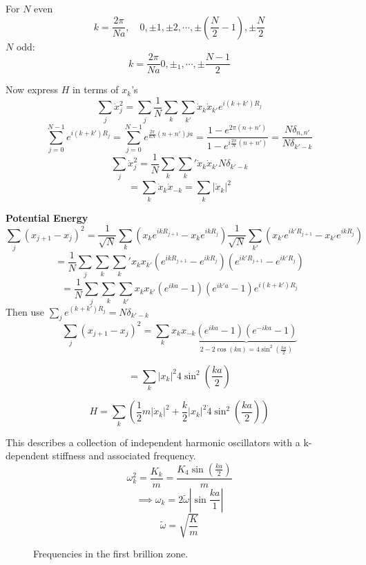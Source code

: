 \documentclass[11pt]{book}
\theoremstyle{definition}
\begin{document}
For $ N $ even
\[ k = \frac{2\pi}{Na}, \quad {0, \pm 1, \pm 2, \cdots, \pm (\frac{N}{2} - 1)}, \pm \frac{N}{2} \] 
$ N $ odd:
\[ k = \frac{2\pi}{Na} {0, \pm_1,\cdots, \pm{\frac{N-1}{2}} } \] 

Now express $ H $ in terms of $ x_k $'s
\[ \sum_j \dot x_j^2 = \sum_j \frac{1}{N}\sum_k \sum_{k'} \dot x_k \dot x_{k'} e^{i(k+k')R_j} \] 
\[ \sum_{j=0}^{N-1}  e^{i(k+k')R_j} 
= \sum_{j=0}^{N-1} e^{\frac{2\pi}{aN}(n+n')ja}
= \frac{1-e^{2\pi(n+n')}}{1 - e^{i\frac{2\pi}{N}(n+n')}}
= \frac{N\delta_{n,n'}}{N\delta_{k'-k}}\] 
\[ \sum_j \dot x_j^2 = \frac{1}{N} \sum_k \sum_k' \dot x_k \dot x_{k'}N \delta_{k'-k} \] 
\[ = \sum_k \dot x_k \dot x_{-k} = \sum_k |\dot x_k|^2\] 

\textbf{Potential Energy} 
\[ \sum_j(x_{j+1}-x_j)^2 = \frac{1}{\sqrt{N}}\sum_k \left(x_ke^{ikR_{j+1}} - x_ke^{ikR_j} \right) 
\frac{1}{\sqrt{N}} \sum_{k'} (x_{k'}e^{ik'R_{j+1}} - x_{k'}e^{ikR_j}) \] 
\[ = \frac{1}{N} \sum_j \sum_k \sum_k' x_k x_{k'} \left( e^{ikR_{j+1}} - e^{ikR_j} \right)
\left( e^{ik'R_{j+1}} - e^{ik'R_j} \right) \] 
\[ = \frac{1}{N} \sum_j \sum_k \sum_{k'} x_k x_{k'} (e^{ika}-1)
\left( e^{ik'a} -1 \right) 
e^{i(k+k')R_j}\] 
Then use $ \sum_j e^{(k+k')R_j} = N \delta_{k'-k} $ 
\[ \sum_j (x_{j+1} - x_j)^2 = \sum_k x_k x_{-k} 
	\underbrace{\left( e^{ika}-1 \right) \left( e^{-ika}-1 \right) }_{2-2\cos(ka)= 4\sin^2(\frac{ka}{2})}
\] 

\[ = \sum_k |x_k|^2 4\sin^2\left( \frac{ka}{2} \right)  \] 

\[ H = \sum_k 
\left( \frac{1}{2}m|\dot x_k|^2 + \frac{k}{2}|x_k|^2 \dot 4 \sin^2(\frac{ka}{2}) \right) 
\] 

This describes a collection of independent harmonic oscillators with a k-dependent stiffness and associated frequency.
\[ \omega_k^2 = \frac{K_k}{m} = \frac{K_4\sin\left( \frac{ka}{2} \right) }{m} \] 
\[ \implies \omega_k = 2 \tilde \omega \left|\sin \frac{ka}{1}\right| \] 
\[ \tilde \omega = \sqrt{\frac{K}{m}} \] 

\begin{figure}[ht]
	\centering
	\caption{Frequencies in the first brillion zone.}
	\label{fig:phonon-modes}
\end{figure}
\end{document}
